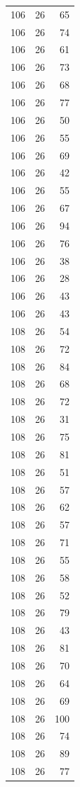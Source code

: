 \documentclass[
  letterpaper,
  DIV=11,
  numbers=noendperiod]{scrreprt}
\renewcommand{\[}{\begin{equation}}
\renewcommand{\]}{\end{equation}}
\begin{document}
\begin{table}
\begin{tabular*}{\linewidth}{@{\extracolsep{\fill}}rrr}
106 & 26 & 65 \\ 
106 & 26 & 74 \\ 
106 & 26 & 61 \\ 
106 & 26 & 73 \\ 
106 & 26 & 68 \\ 
106 & 26 & 77 \\ 
106 & 26 & 50 \\ 
106 & 26 & 55 \\ 
106 & 26 & 69 \\ 
106 & 26 & 42 \\ 
106 & 26 & 55 \\ 
106 & 26 & 67 \\ 
106 & 26 & 94 \\ 
106 & 26 & 76 \\ 
106 & 26 & 38 \\ 
106 & 26 & 28 \\ 
106 & 26 & 43 \\ 
106 & 26 & 43 \\ 
108 & 26 & 54 \\ 
108 & 26 & 72 \\ 
108 & 26 & 84 \\ 
108 & 26 & 68 \\ 
108 & 26 & 72 \\ 
108 & 26 & 31 \\ 
108 & 26 & 75 \\ 
108 & 26 & 81 \\ 
108 & 26 & 51 \\ 
108 & 26 & 57 \\ 
108 & 26 & 62 \\ 
108 & 26 & 57 \\ 
108 & 26 & 71 \\ 
108 & 26 & 55 \\ 
108 & 26 & 58 \\ 
108 & 26 & 52 \\ 
108 & 26 & 79 \\ 
108 & 26 & 43 \\ 
108 & 26 & 81 \\ 
108 & 26 & 70 \\ 
108 & 26 & 64 \\ 
108 & 26 & 69 \\ 
108 & 26 & 100 \\ 
108 & 26 & 74 \\ 
108 & 26 & 89 \\ 
108 & 26 & 77 \\ 
\bottomrule
\end{tabular*}
\end{table}
\end{document}
